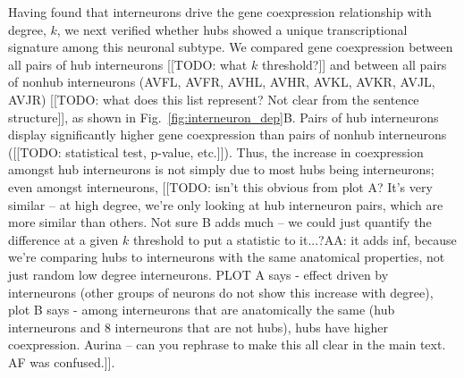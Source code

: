 \documentclass[10pt,letterpaper]{article}
\begin{document}
Having found that interneurons drive the gene coexpression relationship with degree, $k$, we next verified whether hubs showed a unique transcriptional signature among this neuronal subtype.
We compared gene coexpression between all pairs of hub interneurons [[TODO: what $k$ threshold?]] and between all pairs of nonhub interneurons (AVFL, AVFR, AVHL, AVHR, AVKL, AVKR, AVJL, AVJR) [[TODO: what does this list represent? Not clear from the sentence structure]], as shown in Fig.~\ref{fig:interneuron_dep}B.
Pairs of hub interneurons display significantly higher gene coexpression than pairs of nonhub interneurons ([[TODO: statistical test, p-value, etc.]]).
Thus, the increase in coexpression amongst hub interneurons is not simply due to most hubs being interneurons;  even amongst interneurons, [[TODO: isn't this obvious from plot A? It's very similar -- at high degree, we're only looking at hub interneuron pairs, which are more similar than others. Not sure B adds much -- we could just quantify the difference at a given $k$ threshold to put a statistic to it...?AA: it adds inf, because we're comparing hubs to interneurons with the same anatomical properties, not just random low degree interneurons. PLOT A says - effect driven by interneurons (other groups of neurons do not show this increase with degree), plot B says - among interneurons that are anatomically the same (hub interneurons and 8 interneurons that are not hubs), hubs have higher coexpression. Aurina -- can you rephrase to make this all clear in the main text. AF was confused.]].
\end{document}
